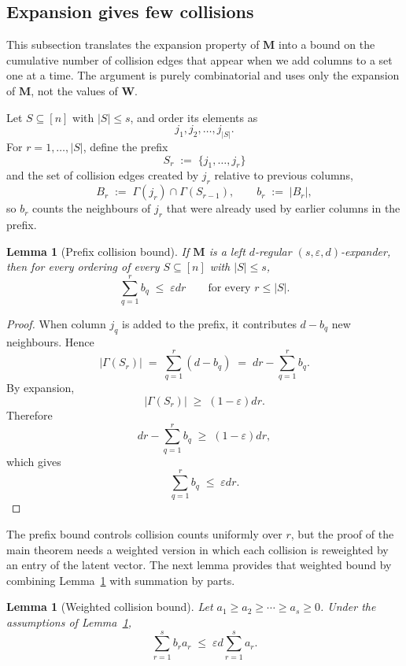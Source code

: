 \documentclass{article}
\theoremstyle{plain}
\newtheorem{lemma}[theorem]{Lemma}
\theoremstyle{definition}
\theoremstyle{remark}
\begin{document}
\subsection{Expansion gives few collisions}

This subsection translates the expansion property of $\mathbf{M}$ into a bound on the cumulative number of collision edges that appear when we add columns to a set one at a time. The argument is purely combinatorial and uses only the expansion of $\mathbf{M}$, not the values of $\mathbf{W}$.

Let $S \subseteq [n]$ with $|S| \le s$, and order its elements as
\[
    j_1, j_2, \dots, j_{|S|}.
\]
For $r = 1, \dots, |S|$, define the prefix
\[
    S_r \;:=\; \{j_1, \dots, j_r\}
\]
and the set of collision edges created by $j_r$ relative to previous columns,
\[
    B_r
    \;:=\;
    \Gamma(j_r) \cap \Gamma(S_{r-1}),
    \qquad
    b_r \;:=\; |B_r|,
\]
so $b_r$ counts the neighbours of $j_r$ that were already used by earlier columns in the prefix.

\begin{lemma}[Prefix collision bound]
\label{lem:prefix_collision_bound}
If $\mathbf{M}$ is a left $d$-regular $(s, \varepsilon, d)$-expander, then for every ordering of every $S \subseteq [n]$ with $|S| \le s$,
\[
    \sum_{q=1}^r b_q
    \;\le\;
    \varepsilon d r
    \qquad
    \text{for every } r \le |S|.
\]
\end{lemma}

\begin{proof}
When column $j_q$ is added to the prefix, it contributes $d - b_q$ new neighbours. Hence
\[
    |\Gamma(S_r)|
    \;=\;
    \sum_{q=1}^r (d - b_q)
    \;=\;
    dr - \sum_{q=1}^r b_q.
\]
By expansion,
\[
    |\Gamma(S_r)|
    \;\ge\;
    (1 - \varepsilon) dr.
\]
Therefore
\[
    dr - \sum_{q=1}^r b_q
    \;\ge\;
    (1 - \varepsilon) dr,
\]
which gives
\[
    \sum_{q=1}^r b_q
    \;\le\;
    \varepsilon d r.
\]
\end{proof}

The prefix bound controls collision counts uniformly over $r$, but the proof of the main theorem needs a weighted version in which each collision is reweighted by an entry of the latent vector. The next lemma provides that weighted bound by combining Lemma~\ref{lem:prefix_collision_bound} with summation by parts.

\begin{lemma}[Weighted collision bound]
\label{lem:weighted_collision_bound}
Let $a_1 \ge a_2 \ge \cdots \ge a_s \ge 0$. Under the assumptions of Lemma~\ref{lem:prefix_collision_bound},
\[
    \sum_{r=1}^s b_r a_r
    \;\le\;
    \varepsilon d
    \sum_{r=1}^s a_r.
\]
\end{lemma}
\end{document}
